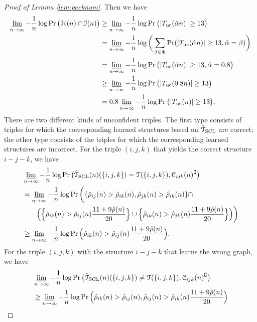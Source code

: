 \documentclass[11pt,onecolumn]{article}
\newcommand{\calC}{\mathcal{C}}
\newcommand{\calH}{\mathcal{H}}
\newcommand{\calI}{\mathcal{I}}
\newcommand{\calT}{\mathcal{T}}
\newcommand{\hatcalT}{\hat{\calT}}
\newcommand{\halpha}{\hat{\alpha}}
\newcommand{\hrho}{\hat{\rho}}
\begin{document}
\begin{proof}[Proof of Lemma \ref{lem:packnum}]
	Then we have
	\begin{align}
		\varliminf_{n\rightarrow\infty}-\frac{1}{n}\log\Pr\big(\calH(n)\cap \calI(n)\big)&\geq \varliminf_{n\rightarrow\infty}-\frac{1}{n}\log\Pr\big(|T_{{\rm uc}}(\halpha n)|\geq 13\big)\\
		&=\varliminf_{n\rightarrow\infty}-\frac{1}{n}\log\bigg(\sum_{\beta\in\Psi}\Pr(|T_{{\rm uc}}(\halpha n)|\geq 13,\halpha=\beta)\bigg)\\
		&=\varliminf_{n\rightarrow\infty}-\frac{1}{n}\log\Pr\big(|T_{{\rm uc}}(\halpha n)|\geq 13,\halpha=0.8\big)\\
		&\geq \varliminf_{n\rightarrow\infty}-\frac{1}{n}\log\Pr \big(|T_{{\rm uc}}(0.8 n)|\geq 13\big)\\
		&=0.8 \varliminf_{n\rightarrow\infty}-\frac{1}{n}\log\Pr\big(|T_{{\rm uc}}(n)|\geq 13\big),
	\end{align}
	There are two different kinds of unconfident triples. The first type consists of  triples for which the corresponding learned structures based on $\hatcalT_{{\rm SCL}}$ are correct; the other type consists of the triples for which the corresponding learned structures are incorrect. For the triple $(i,j,k)$ that yields the correct    structure $i-j-k$, we have
	\begin{align}
		&\varliminf_{n\rightarrow\infty}-\frac{1}{n}\log\Pr\big(\hatcalT_{{\rm SCL}}(n)(\{i,j,k\})=\calT(\{i,j,k\}),\calC_{ijk}(n)^{\complement}\big)\nonumber\\
		&=\varliminf_{n\rightarrow\infty}-\frac{1}{n}\log\Pr\bigg(\{\hrho_{ij}( n)>\hrho_{ik}( n),\hrho_{jk}( n)>\hrho_{ik}( n)\}\cap \nonumber\\*
		& \qquad\Big(\Big\{\hrho_{ik}( n)>\hrho_{ij}( n)\frac{11+9\hrho( n)}{20}\Big\}\cup\Big\{\hrho_{ik}( n)>\hrho_{jk}( n)\frac{11+9\hrho( n)}{20}\Big\}\Big)\bigg)\\
		&\geq \varliminf_{n\rightarrow\infty}-\frac{1}{n}\log\Pr\Big(\hrho_{ik}( n)>\hrho_{ij}( n)\frac{11+9\hrho( n)}{20}\Big).
	\end{align}
	For the triple $(i,j,k)$ with the  structure $i-j-k$ that learns the wrong graph, we have
	\begin{align}
		&\varliminf_{n\rightarrow\infty}-\frac{1}{n}\log\Pr\big(\hatcalT_{{\rm SCL}}(n)(\{i,j,k\})\neq \calT(\{i,j,k\}),\calC_{ijk}(n)^{\complement}\big)\nonumber\\
		&\geq\varliminf_{n\rightarrow\infty}-\frac{1}{n}\log\Pr\Big(\hrho_{ik}( n)>\hrho_{ij}( n),\hrho_{ij}( n)>\hrho_{ik}( n)\frac{11+9\hrho( n)}{20}\Big)\\

\end{align}
\end{proof}
\end{document}
